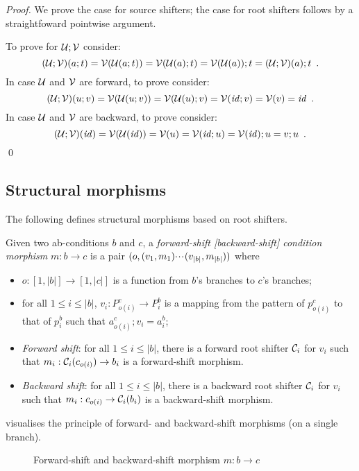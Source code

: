 \begin{proof}
We prove the case for source shifters; the case for root shifters follows by a straightfoward pointwise argument.

To prove  for $\mathcal{U};\mathcal{V}$ consider:
\[ (\mathcal{U};\mathcal{V})(a;t) = \mathcal{V}(\mathcal{U}(a;t))= \mathcal{V}(\mathcal{U}(a);t)=\mathcal{V}(\mathcal{U}(a));t=(\mathcal{U};\mathcal{V})(a);t \enspace. \]
In case $\mathcal{U}$ and $\mathcal{V}$ are forward, to prove  consider:
\[ (\mathcal{U};\mathcal{V})(u;v) = \mathcal{V}(\mathcal{U}(u;v)) = \mathcal{V}(\mathcal{U}(u);v) = \mathcal{V}(\mathit{id};v) = \mathcal{V}(v) = \mathit{id} \enspace. \]
In case $\mathcal{U}$ and $\mathcal{V}$ are backward, to prove  consider:
\[ (\mathcal{U};\mathcal{V})(\mathit{id}) = \mathcal{V}(\mathcal{U}(\mathit{id})) = \mathcal{V}(u) = \mathcal{V}(\mathit{id};u) = \mathcal{V}(\mathit{id});u = v;u \enspace. \]
\qed
\end{proof}

\subsection{Structural morphisms}

The following defines structural morphisms based on root shifters.

\begin{definition}
  Given two ab-conditions $b$ and $c$, a \emph{forward-shift [backward-shift] condition morphism} $m: b \to c$ is a pair $(o,(v_1,m_1){\cdotp\mkern-2mu\cdotp\mkern-2mu\cdotp\mkern1mu} (v_{|b|},m_{|b|}))$ where
  \begin{itemize}
  \item $o:[1,|b|]\to[1,|c|]$ is a function from $b$'s branches to $c$'s branches;
  \item for all $1\leq i\leq |b|$, $v_i:P^c_{o(i)}\to P^b_i$ is a mapping from the pattern of $p^c_{o(i)}$ to that of $p^b_i$ such that $a^c_{o(i)};v_i=a^b_i$;
  \item\emph{Forward shift}: for all $1\leq i\leq |b|$, there is a forward root shifter $\mathcal{C}_i$ for $v_i$ such that $m_i:\mathcal{C}_i(c_{o(i)})\to b_i$ is a forward-shift morphism.
  \item\emph{Backward shift}: for all $1\leq i\leq |b|$, there is a backward root shifter $\mathcal{C}_i$ for $v_i$ such that $m_i:c_{o(i)}\to \mathcal{C}_i(b_i)$ is a backward-shift morphism.
  \end{itemize}
\end{definition}
%
 visualises the principle of forward- and backward-shift morphisms (on a single branch).
%
\begin{figure}
\centering

\caption{Forward-shift and backward-shift morphism $m:b\to c$}
\end{figure}

